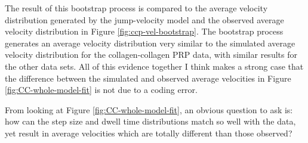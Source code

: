 \documentclass{article}
\begin{document}
The result of this bootstrap process is compared to the average
velocity distribution generated by the jump-velocity model and the
observed average velocity distribution in Figure
\ref{fig:ccp-vel-bootstrap}. The bootstrap process generates an
average velocity distribution very similar to the simulated average
velocity distribution for the collagen-collagen PRP data, with similar
results for the other data sets. All of this evidence together I think
makes a strong case that the difference between the simulated and
observed average velocities in Figure \ref{fig:CC-whole-model-fit} is
not due to a coding error.

From looking at Figure \ref{fig:CC-whole-model-fit}, an obvious
question to ask is: how can the step size and dwell time distributions
match so well with the data, yet result in average velocities which
are totally different than those observed? 
\end{document}
